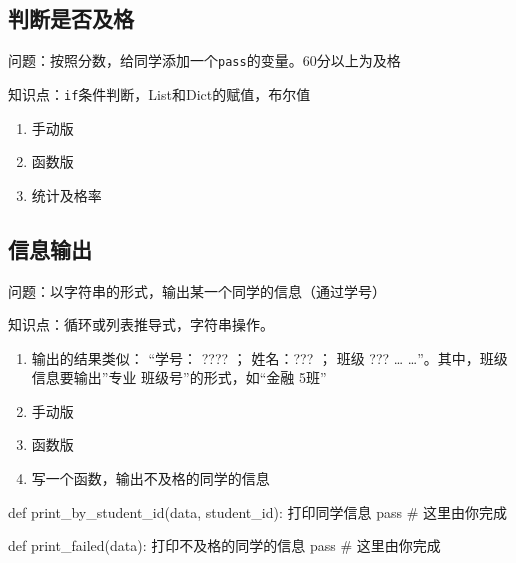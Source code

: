 \documentclass[
  letterpaper,
  DIV=11,
  numbers=noendperiod]{scrreprt}
\newenvironment{Shaded}{\begin{snugshade}}{\end{snugshade}}
\newcommand{\CommentTok}[1]{\textcolor[rgb]{0.37,0.37,0.37}{#1}}
\newcommand{\ControlFlowTok}[1]{\textcolor[rgb]{0.00,0.23,0.31}{#1}}
\newcommand{\KeywordTok}[1]{\textcolor[rgb]{0.00,0.23,0.31}{#1}}
\newcommand{\NormalTok}[1]{\textcolor[rgb]{0.00,0.23,0.31}{#1}}
\providecommand{\tightlist}{%
  \setlength{\itemsep}{0pt}\setlength{\parskip}{0pt}}\usepackage{longtable,booktabs,array}
\begin{document}
\hypertarget{ux5224ux65adux662fux5426ux53caux683c}{%
\subsection{判断是否及格}\label{ux5224ux65adux662fux5426ux53caux683c}}

问题：按照分数，给同学添加一个\texttt{pass}的变量。60分以上为及格

知识点：\texttt{if}条件判断，List和Dict的赋值，布尔值

\begin{enumerate}
\def\labelenumi{\arabic{enumi}.}
\tightlist
\item
  手动版
\item
  函数版
\item
  统计及格率
\end{enumerate}

\hypertarget{ux4fe1ux606fux8f93ux51fa}{%
\subsection{信息输出}\label{ux4fe1ux606fux8f93ux51fa}}

问题：以字符串的形式，输出某一个同学的信息（通过学号）

知识点：循环或列表推导式，字符串操作。

\begin{enumerate}
\def\labelenumi{\arabic{enumi}.}
\tightlist
\item
  输出的结果类似： ``学号： ???? ； 姓名：??? ； 班级 ??? \ldots{}
  \ldots{}''。其中，班级信息要输出''专业 班级号''的形式，如``金融 5班''
\item
  手动版
\item
  函数版
\item
  写一个函数，输出不及格的同学的信息
\end{enumerate}

\begin{Shaded}
\begin{Highlighting}[]
\KeywordTok{def}\NormalTok{ print\_by\_student\_id(data, student\_id):}
  \CommentTok{\textquotesingle{}\textquotesingle{}\textquotesingle{}}
\CommentTok{  打印同学信息}
\CommentTok{  \textquotesingle{}\textquotesingle{}\textquotesingle{}}
  \ControlFlowTok{pass} \CommentTok{\# 这里由你完成}

\KeywordTok{def}\NormalTok{ print\_failed(data):}
  \CommentTok{\textquotesingle{}\textquotesingle{}\textquotesingle{}}
\CommentTok{  打印不及格的同学的信息}
\CommentTok{  \textquotesingle{}\textquotesingle{}\textquotesingle{}}
  \ControlFlowTok{pass} \CommentTok{\# 这里由你完成}
\end{Highlighting}
\end{Shaded}
\end{document}
